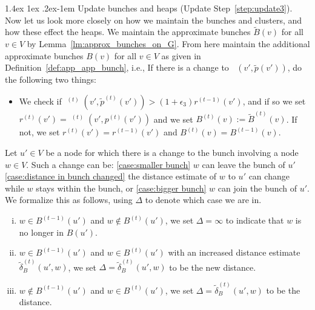\documentclass[11pt]{article}
\makeatletter
\theoremstyle{definition}
\theoremstyle{remark}
\DeclareMathOperator{\dLNbunch}{\delta_{\tilde{B}}}
\renewcommand{\paragraph}{%
  \@startsection{paragraph}{4}%
  {\z@}{1.4ex \@plus 1ex \@minus .2ex}{-1em}%
  {\normalfont\normalsize\bfseries}%
}
\makeatother
\begin{document}
\begin{titlepage}
\paragraph{Update bunches and heaps (Update Step~\ref{step:update3}).}
Now let us look more closely on how we maintain the bunches and clusters, and how these effect the heaps. We maintain the approximate bunches $\tilde B(v)$ for all $v\in V$ by Lemma~\ref{lm:approx_bunches_on_G}. From here maintain the additional approximate bunches $B(v)$ for all $v\in V$ as given in Definition~\ref{def:app_app_bunch}, i.e., 
If there is a change to $\dLNbunch(v',\tilde p(v'))$, do the following two things:\label{step:update_pivots}
    \begin{itemize}
        \item We check if $\dLNbunch^{(t)}(v',\tilde p^{(t)}(v'))> (1+\epsilon_3)r^{(t-1)}(v')$, and if so we set $r^{(t)}(v')=\dLNbunch^{(t)}(v',p^{(t)}(v'))$ and we set $B^{(t)}(v):=\tilde B^{(t)}(v)$. If not, we set $r^{(t)}(v')=r^{(t-1)}(v')$ and $B^{(t)}(v)=B^{(t-1)}(v)$.
    \end{itemize}
 Let $u'\in V$ be a node for which there is a change to the bunch involving a node $w\in V$. Such a change can be: \ref{case:smaller bunch} $w$ can leave the bunch of $u'$ \ref{case:distance in bunch changed} the distance estimate of $w$ to $u'$ can change while $w$ stays within the bunch, or \ref{case:bigger bunch} $w$ can join the bunch of $u'$. We formalize this as follows, using $\Delta$ to denote which case we are in.
    \begin{enumerate}[(i)]
        \item $w\in B^{(t-1)}(u')$ and $w\notin B^{(t)}(u')$, we set $\Delta=\infty$ to indicate that $w$ is no longer in $B(u')$. \label{case:smaller bunch}
        \item $w\in B^{(t-1)}(u')$ and $w\in B^{(t)}(u')$ with an increased distance estimate $\tilde \delta_B^{(t)}(u',w)$, we set $\Delta=\tilde \delta_B^{(t)}(u',w)$ to be the new distance. \label{case:distance in bunch changed}
        \item \label{case:bigger bunch} $w\notin B^{(t-1)}(u')$ and $w\in B^{(t)}(u')$, we set $\Delta=\tilde \delta_B^{(t)}(u',w)$ to be the distance. 
    \end{enumerate}
        
    
    

\end{titlepage}
\end{document}
